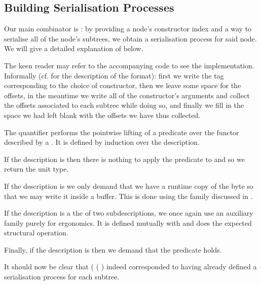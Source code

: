 \subsection{Building Serialisation Processes}

Our main combinator is \IdrisFunction{(\#)}: by providing
a node's constructor index
and a way to serialise all of the node's subtrees,
we obtain a serialisation process for said node.
%
We will give a detailed explanation of  below.


The keen reader may refer to the accompanying code to see the implementation.
Informally (cf.  for the description of the format):
first we write the tag corresponding to the choice of constructor,
then we leave some space for the offsets,
in the meantime we write all of the constructor's arguments and collect the offsets
associated to each subtree while doing so,
and finally we fill in the space we had left blank with the offsets
we have thus collected.

The  quantifier performs the pointwise lifting of a predicate over
the functor described by a . It is defined by induction over
the description.


If the description is  then there is nothing to apply
the predicate to and so we return the unit type.

If the description is  we only demand that we have a runtime
copy of the byte so that we may write it inside a buffer. This is done using
the  family discussed in .

If the description is a the  of two subdescriptions, we once
again use an auxiliary family purely for ergonomics. It is defined mutually
with  and does the expected structural operation.


Finally, if the description is  then we demand that the
predicate holds.

It should now be clear that
( \IdrisKeyword{(} \IdrisKeyword{)}
( \IdrisKeyword{)}) indeed corresponded
to having already defined a serialisation process for each subtree.

